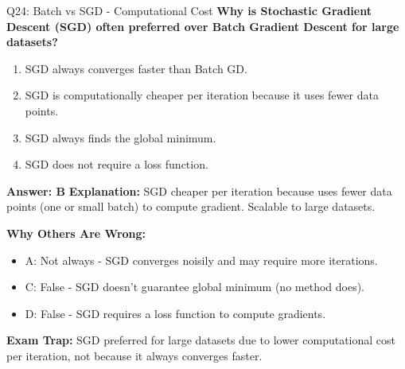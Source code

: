 \documentclass[8pt]{beamer}
\begin{document}
	\begin{frame}{Q24: Batch vs SGD - Computational Cost}
		\fontsize{6.5}{7.5}\selectfont
		\textbf{Why is Stochastic Gradient Descent (SGD) often preferred over Batch Gradient Descent for large datasets?}
		
		\begin{enumerate}
			\item SGD always converges faster than Batch GD.
			\item SGD is computationally cheaper per iteration because it uses fewer data points.
			\item SGD always finds the global minimum.
			\item SGD does not require a loss function.
		\end{enumerate}
		
		\vspace{0.05cm}
		\textcolor{myblue}{\textbf{Answer: B}}
		\vspace{0.05cm}
		\textcolor{myblue}{\textbf{Explanation:}} SGD cheaper per iteration because uses fewer data points (one or small batch) to compute gradient. Scalable to large datasets.
		
		\vspace{0.05cm}
		\textcolor{myred}{\textbf{Why Others Are Wrong:}}
		\begin{itemize}
			\item \textcolor{myred}{A:} Not always - SGD converges noisily and may require more iterations.
			\item \textcolor{myred}{C:} False - SGD doesn't guarantee global minimum (no method does).
			\item \textcolor{myred}{D:} False - SGD requires a loss function to compute gradients.
		\end{itemize}
		
		\textcolor{myred}{\textbf{Exam Trap:}} SGD preferred for large datasets due to \textcolor{myblue}{lower computational cost per iteration}, not because it always converges faster.
	\end{frame}
	
\end{document}
